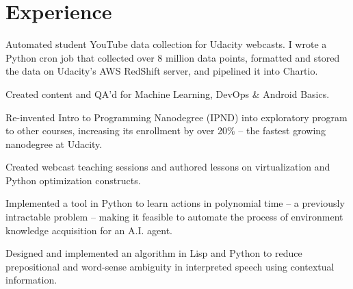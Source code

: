 \documentclass[]{deedy-resume-openfont}
\begin{document}
\begin{minipage}[t]{0.66\textwidth} 


\section{Experience}

\vspace{\topsep} %
\begin{tightemize}

\item Automated student YouTube data collection for Udacity webcasts. I wrote a Python cron job that collected over 8 million data points, formatted and stored the data on Udacity's AWS RedShift server, and pipelined it into Chartio.

\item Created content and QA'd for Machine Learning, DevOps \& Android Basics.

\item Re-invented Intro to Programming Nanodegree (IPND) into exploratory program to other courses, increasing its enrollment by over 20\% -- the fastest growing nanodegree at Udacity.

\item Created webcast teaching sessions and authored lessons on virtualization and Python optimization constructs.

\end{tightemize}
\sectionsep

\begin{tightemize}
\item Implemented a tool in Python to learn actions in polynomial time -- a previously intractable problem -- making it feasible to automate the process of environment knowledge acquisition for an A.I. agent.

\item Designed and implemented an algorithm in Lisp and Python to reduce prepositional and word-sense ambiguity in interpreted speech using contextual information.
\end{tightemize}
\sectionsep


\end{minipage}
\end{document}
